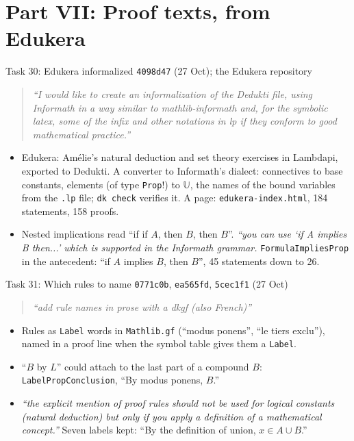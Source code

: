 \documentclass[10pt,aspectratio=169]{beamer}
\newcommand{\bad}[1]{\textcolor{warn}{#1}}
\newcommand{\ok}[1]{\textcolor{good}{#1}}
\newcommand{\commit}[1]{\texttt{\footnotesize #1}}
\newcommand{\prompt}[1]{\begin{quote}\small\itshape ``#1''\end{quote}}
\begin{document}
\section{Part VII: Proof texts, from Edukera}

\begin{frame}{Task 30: Edukera informalized}
  \commit{4098d47} (27 Oct); the Edukera repository
  \prompt{I would like to create an informalization of the Dedukti file, using Informath in a
  way similar to mathlib-informath and, for the symbolic latex, some of the infix and other
  notations in lp if they conform to good mathematical practice.}
  \begin{itemize}\small
    \item Edukera: Amélie's natural deduction and set theory exercises in Lambdapi, exported
          to Dedukti. A converter to Informath's dialect: connectives to base constants,
          elements (of type \texttt{Prop}!) to $\mathbb{U}$, the names of the bound variables
          from the \texttt{.lp} file; \texttt{dk check} verifies it. A page:
          \texttt{edukera-index.html}, 184 statements, 158 proofs.
    \item Nested implications read \bad{``if if $A$, then $B$, then $B$''}.
          \textit{``you can use `if A implies B then...' which is supported in the Informath
          grammar.}  \texttt{FormulaImpliesProp} in the antecedent: \ok{``if $A$ implies $B$,
          then $B$''}, 45 statements down to 26.
  \end{itemize}
\end{frame}

\begin{frame}{Task 31: Which rules to name}
  \commit{0771c0b}, \commit{ea565fd}, \commit{5cec1f1} (27 Oct)
  \prompt{add rule names in prose with a dkgf (also French)}
  \begin{itemize}\small
    \item Rules as \texttt{Label} words in \texttt{Mathlib.gf} (``modus ponens'', ``le tiers
          exclu''), named in a proof line when the symbol table gives them a \texttt{Label}.
    \item ``$B$ by $L$'' could attach to the last part of a compound $B$:
          \texttt{LabelPropConclusion}, \ok{``By modus ponens, $B$.''}
    \item \textit{``the explicit mention of proof rules should not be used for logical
          constants (natural deduction) but only if you apply a definition of a mathematical
          concept.''} Seven labels kept: ``By the definition of union, $x \in A \cup B$.''
  \end{itemize}
\end{frame}
\end{document}
